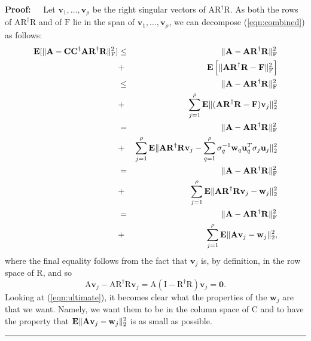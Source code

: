 \documentclass[11pt]{article}
\newcommand{\FNormS}[1]{\mbox{}\|#1\|_\mathrm{F}^2}
\newenvironment{proof}{\begin{trivlist} \item {\bf Proof:~~}}
  {\qed\end{trivlist}}
\newcommand{\mat}[1]{{\ensuremath{\bm{\mathrm{#1}}}}}
\renewcommand{\vec}[1]{\ensuremath{\bm{#1}}}
\def\u{{\mathbf u}}
\def\ve{{\mathbf v}}
\def\matA{\mat{A}}
\def\matC{\mat{C}}
\def\matF{\mat{F}}
\def\matI{\mat{I}}
\def\matR{\mat{R}}
\def\w{{\mathbf{w}}}
\def\qed{\hfill\rule{2mm}{2mm}}
\begin{document}
\begin{proof}
Let $\ve_1, \ldots, \ve_{\rho}$ be the right singular vectors of $\matA\matR^{\dagger}\matR$. As both the rows of
$\matA\matR^{\dagger}\matR$ and of $\matF$ lie in the span of $\ve_1, \ldots, \ve_{\rho}$, we can decompose
(\ref{eqn:combined}) as follows:
\begin{eqnarray}\label{eqn:ultimate}
{\bf E}[\FNormS{\matA-\matC\matC^{\dagger}\matA\matR^{\dagger} \matR}] 
& \leq & \FNormS{\matA-\matA\matR^{\dagger}\matR} \notag \\
& + & {\bf E}\left [\FNormS{\matA\matR^{\dagger} \matR - \matF} \right ] \notag \\
& \leq & \FNormS{\matA-\matA\matR^{\dagger}\matR} \notag \\
&+& \sum_{j=1}^{\rho} {\bf E}\|(\matA\matR^{\dagger}\matR-\matF)\ve_j\|_2^2 \notag \\
& = & \FNormS{\matA-\matA\matR^{\dagger}\matR} \notag \\
&+& \sum_{j=1}^{\rho} {\bf E}\|\matA\matR^{\dagger}\matR\ve_j - \sum_{q=1}^{\rho}\sigma_q^{-1}\w_q \u_q^T \sigma_j \u_j\|_2^2 \notag \\
& = & \FNormS{\matA-\matA\matR^{\dagger}\matR} \notag \\
& + & \sum_{j=1}^{\rho} {\bf E} \|\matA\matR^{\dagger}\matR\ve_j - \w_j\|_2^2 \notag \\
& = & \FNormS{\matA-\matA\matR^{\dagger}\matR} \notag \\
& + & \sum_{j=1}^{\rho} {\bf E} \|\matA\ve_j - \w_j\|_2^2,
\end{eqnarray}
where the final equality follows from the fact that $\ve_j$ is, by definition, in the row space of $\matR$, 
and so $$\matA\ve_j - \matA\matR^{\dagger}\matR\ve_j = \matA(\matI-\matR^{\dagger}\matR)\ve_j = \vec0.$$
Looking at (\ref{eqn:ultimate}), it becomes clear what the properties of the $\w_j$ are that we want. Namely, 
we want them to be in the column space of $\matC$ and to have the property that ${\bf E}\|\matA\ve_j - \w_j\|_2^2$
is as small as possible. 


\end{proof}
\end{document}
